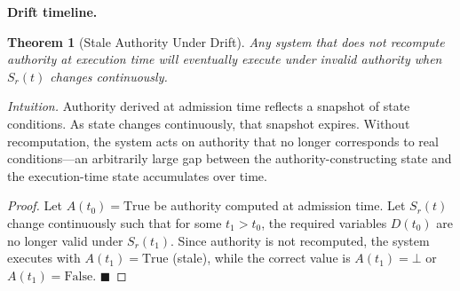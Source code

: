 \documentclass[11pt]{article}
\newtheorem{theorem}{Theorem}
\begin{document}
\medskip
\noindent\textbf{Drift timeline.}
\begin{center}
\end{center}
\medskip

\begin{theorem}[Stale Authority Under Drift]
Any system that does not recompute authority at execution time will eventually execute
under invalid authority when $S_r(t)$ changes continuously.
\end{theorem}

\textit{Intuition.} Authority derived at admission time reflects a snapshot of state
conditions. As state changes continuously, that snapshot expires. Without recomputation,
the system acts on authority that no longer corresponds to real conditions---an
arbitrarily large gap between the authority-constructing state and the execution-time
state accumulates over time.

\begin{proof}
Let $A(t_0) = \text{True}$ be authority computed at admission time. Let $S_r(t)$ change
continuously such that for some $t_1 > t_0$, the required variables $D(t_0)$ are no
longer valid under $S_r(t_1)$. Since authority is not recomputed, the system executes with
$A(t_1) = \text{True}$ (stale), while the correct value is $A(t_1) = \bot$ or
$A(t_1) = \text{False}$. \hfill $\blacksquare$
\end{proof}
\end{document}
